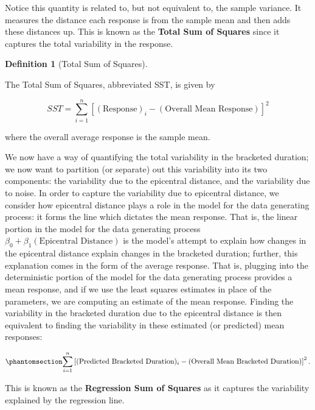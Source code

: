 \documentclass[
  letterpaper,
  DIV=11,
  numbers=noendperiod]{scrreprt}
\theoremstyle{plain}
\theoremstyle{definition}
\theoremstyle{definition}
\newtheorem{definition}{Definition}[chapter]
\theoremstyle{remark}
\begin{document}
Notice this quantity is related to, but not equivalent to, the sample
variance. It measures the distance each response is from the sample mean
and then adds these distances up. This is known as the \textbf{Total Sum
of Squares} since it captures the total variability in the response.

\begin{definition}[Total Sum of
Squares]\protect\hypertarget{def-sst}{}\label{def-sst}

The Total Sum of Squares, abbreviated SST, is given by

\[SST = \sum_{i=1}^{n} \left[(\text{Response})_i - (\text{Overall Mean Response})\right]^2\]

where the overall average response is the sample mean.

\end{definition}

We now have a way of quantifying the total variability in the bracketed
duration; we now want to partition (or separate) out this variability
into its two components: the variability due to the epicentral distance,
and the variability due to noise. In order to capture the variability
due to epicentral distance, we consider how epicentral distance plays a
role in the model for the data generating process: it forms the line
which dictates the mean response. That is, the linear portion in the
model for the data generating process
\(\beta_0 + \beta_1 (\text{Epicentral Distance})\) is the model's
attempt to explain how changes in the epicentral distance explain
changes in the bracketed duration; further, this explanation comes in
the form of the average response. That is, plugging into the
deterministic portion of the model for the data generating process
provides a mean response, and if we use the least squares estimates in
place of the parameters, we are computing an estimate of the mean
response. Finding the variability in the bracketed duration due to the
epicentral distance is then equivalent to finding the variability in
these estimated (or predicted) mean responses:

\begin{equation}\phantomsection\label{eq-regquality-ssr}{\sum_{i=1}^{n} \left[(\text{Predicted Bracketed Duration})_i - (\text{Overall Mean Bracketed Duration})\right]^2.}\end{equation}

This is known as the \textbf{Regression Sum of Squares} as it captures
the variability explained by the regression line.
\end{document}
